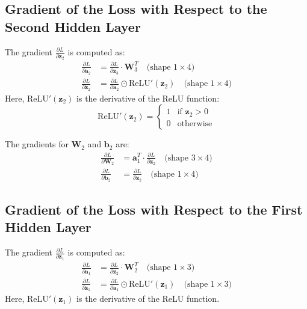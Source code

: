 \begin{notechapter}
\subsection{Gradient of the Loss with Respect to the Second Hidden Layer}
The gradient \(\frac{\partial L}{\partial \bm{z}_2}\) is computed as:
\begin{align*}
    \frac{\partial L}{\partial \bm{a}_2} &= \frac{\partial L}{\partial \bm{z}_3}
    \cdot \bm{W}_3^T \quad \text{(shape } 1 \times 4\text{)} \\
    \frac{\partial L}{\partial \bm{z}_2} &= \frac{\partial L}{\partial \bm{a}_2}
    \odot \text{ReLU}'(\bm{z}_2) \quad \text{(shape } 1 \times 4\text{)}
\end{align*}
Here, \(\text{ReLU}'(\bm{z}_2)\) is the derivative of the ReLU function:
\[
\text{ReLU}'(\bm{z}_2) = \begin{cases}
    1 & \text{if } \bm{z}_2 > 0 \\
    0 & \text{otherwise}
\end{cases}
\]

\begin{center}
\end{center}

The gradients for \(\bm{W}_2\) and \(\bm{b}_2\) are:
\begin{align*}
    \frac{\partial L}{\partial \bm{W}_2} &= \bm{a}_1^T \cdot
    \frac{\partial L}{\partial \bm{z}_2} \quad
    \text{(shape } 3 \times 4\text{)} \\
    \frac{\partial L}{\partial \bm{b}_2} &= \frac{\partial L}{\partial \bm{z}_2}
    \quad \text{(shape } 1 \times 4\text{)}
\end{align*}

\subsection{Gradient of the Loss with Respect to the First Hidden Layer}
The gradient \(\frac{\partial L}{\partial \bm{z}_1}\) is computed as:
\begin{align*}
    \frac{\partial L}{\partial \bm{a}_1} &= \frac{\partial L}{\partial \bm{z}_2}
    \cdot \bm{W}_2^T \quad \text{(shape } 1 \times 3\text{)} \\
    \frac{\partial L}{\partial \bm{z}_1} &= \frac{\partial L}{\partial \bm{a}_1}
    \odot \text{ReLU}'(\bm{z}_1) \quad \text{(shape } 1 \times 3\text{)}
\end{align*}
Here, \(\text{ReLU}'(\bm{z}_1)\) is the derivative of the ReLU function.


\end{notechapter}
